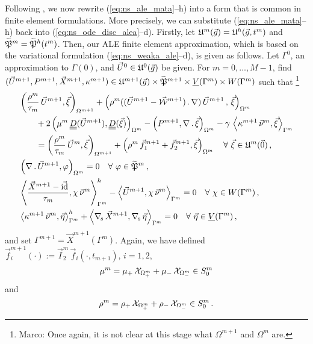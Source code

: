 Following \cite{NobilePhd}, we now rewrite (\ref{eq:ns_ale_mata}--h) into a
form that is common in finite element formulations. More precisely, we can
substitute (\ref{eq:ns_ale_mata}--h) back into (\ref{eq:ns_ode_disc_alea}--d).
Firstly, let $\uspacediscale{g}{m}=\uspacesemidiscale{g}{h}{t^m}$ and
$\pnormspaceale^m=\pnormspaceale^h(t^m)$. Then, our ALE finite element
approximation, which is based on the variational formulation
(\ref{eq:ns_weaka_ale}--d), is given as follows. Let $\Gamma^0$, an
approximation to $\Gamma(0)$, and $\vec U^0\in \uspacediscale{g}{0}$ be given.
For $m=0,\ldots, M-1$, find $(\vec U^{m+1},P^{m+1}, \vec X^{m+1}, \kappa^{m+1})
\in \uspacediscale{g}{m+1}\times \pnormspaceale^{m+1} \times \Vh \times \Wh$
such that
\footnote{Marco: Once again, it is not clear at this stage what
$\Omega^{m+1}$ and $\Omega^m$ are.}
\begin{subequations}
\begin{align}
& \left( \frac{\rho^m}{\tau_m}\,\vec U^{m+1}, \vec \xi \right)_{\Omega^{m+1}}
+ \left(\rho^m( (\vec U^{m+1}- \W^{m+1})\,.\,\nabla)\,\vec U^{m+1}\,,
\,\vec \xi \right)_{\Omega^m}\nonumber \\
& \qquad + 2\left(\mu^m\,\mat D(\vec U^{m+1}), \mat D(\vec \xi)
\right)_{\Omega^m} - \left(P^{m+1}, \nabla\,.\,\vec \xi\right)_{\Omega^m}
- \gamma\,\left\langle \kappa^{m+1}\,\vec\nu^m , \vec\xi\right\rangle_{\Gamma^m}
\nonumber \\
& \qquad=  \left(\frac{\rho^m}{\tau_m}\,\vec U^m,\vec \xi \right)_{\Omega^{m+1}}
+ \left(\rho^m\,\vec f_1^{m+1}+\vec f_2^{m+1}, \vec \xi\right)_{\Omega^m}
\quad \forall\ \vec\xi \in \uspacediscale{0}{m}\,, \label{eq:ale_HGa} \\
& \left(\nabla\,.\,\vec U^{m+1}, \varphi\right)_{\Omega^m}  = 0
\quad \forall\ \varphi \in \pnormspaceale^m\,,\label{eq:ale_HGb} \\
&  \left\langle \frac{\vec X^{m+1} - \vec\id}{\tau_m} ,\chi\,\vec\nu^m
\right\rangle_{\Gamma^m}^h - \left\langle \vec U^{m+1}, \chi\,\vec\nu^m
\right\rangle_{\Gamma^m}  = 0 \quad \forall\ \chi \in \Wh\,,
\label{eq:ale_HGc}\\
& \left\langle \kappa^{m+1}\,\vec\nu^m, \vec\eta \right\rangle_{\Gamma^m}^h
+ \left\langle \nabs\,\vec X^{m+1}, \nabs\,\vec \eta \right\rangle_{\Gamma^m} =
0 \quad \forall\ \vec\eta \in \Vh\,, \label{eq:ale_HGd}
\end{align}
\end{subequations}
and set $\Gamma^{m+1} = \vec X^{m+1}(\Gamma^m)$. Again, we have defined
$\vec f_i^{m+1}(\cdot) := \vec I^m_2\,\vec f_i(\cdot,t_{m+1})$, $i=1,2$,
\begin{equation}
\mu^m = \mu_+\,\charfcn{\Omega^m_+} + \mu_-\,\charfcn{\Omega^m_-}\in S^m_0
\end{equation}
and
\begin{equation}
\rho^m = \rho_+\,\charfcn{\Omega^m_+} + \rho_-\,\charfcn{\Omega^m_-}\in S^m_0\,.
\end{equation}

